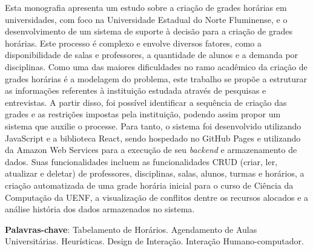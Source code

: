 \setlength{\absparsep}{18pt} %
\begin{resumo}

  Esta monografia apresenta um estudo sobre a criação de grades horárias em universidades, com foco na Universidade Estadual do Norte Fluminense, e o desenvolvimento de um sistema de suporte à decisão para a criação de grades horárias. Este processo é complexo e envolve diversos fatores, como a disponibilidade de salas e professores, a quantidade de alunos e a demanda por disciplinas. Como uma das maiores dificuldades no ramo acadêmico da criação de grades horárias é a modelagem do problema, este trabalho se propõe a estruturar as informações referentes à instituição estudada através de pesquisas e entrevistas. A partir disso, foi possível identificar a sequência de criação das grades e as restrições impostas pela instituição, podendo assim propor um sistema que auxilie o processe. Para tanto, o sistema foi desenvolvido utilizando JavaScript e a biblioteca React, sendo hospedado no GitHub Pages e utilizando da Amazon Web Services para a execução de seu \textit{backend} e armazenamento de dados. Suas funcionalidades incluem as funcionalidades CRUD (criar, ler, atualizar e deletar) de professores, disciplinas, salas, alunos, turmas e horários, a criação automatizada de uma grade horária inicial para o curso de Ciência da Computação da UENF, a visualização de conflitos dentre os recursos alocados e a análise história dos dados armazenados no sistema.

  \textbf{Palavras-chave}: Tabelamento de Horários. Agendamento de Aulas Universitárias. Heurísticas. Design de Interação. Interação Humano-computador.




\end{resumo}
